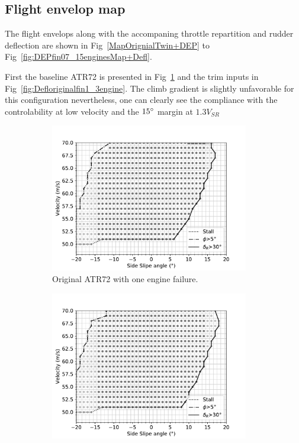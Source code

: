 \subsection{Flight envelop map}
The flight envelops along with the accompaning throttle repartition and rudder deflection are shown in Fig~\ref{MapOrignialTwin+DEP} to Fig~\ref{fig:DEPfin07_15enginesMap+Defl}.

First the baseline ATR72 is presented in Fig~\ref{fig:originalfin1_3engine} and the trim inputs in Fig~\ref{fig:Defloriginalfin1_3engine}. The climb gradient is slightly unfavorable for this configuration nevertheless, one can clearly see the compliance with the controlability at low velocity and the $15\degree$ margin at $1.3V_{SR}$

\begin{figure}[hbt!]
	\centering
	\begin{subfigure}{0.49\textwidth}
		\includegraphics[width=0.95\textwidth]{originalMapBetaVelfin1Eng3RudFalse}
		\caption{Original ATR72 with one engine failure.}
		\label{fig:originalfin1_3engine}
	\end{subfigure}
	\begin{subfigure}{0.49\textwidth}
		\includegraphics[width=0.95\textwidth]{originalMapBetaVelfin1Eng15RudFalse}

\end{subfigure}
\end{figure}
